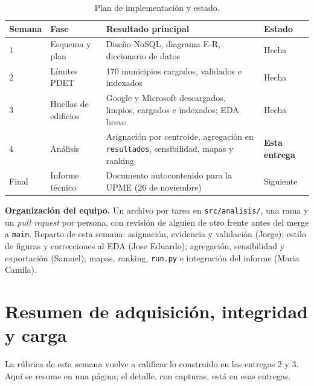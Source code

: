 \documentclass[11pt,a4paper]{article}
\newcommand{\campo}[1]{\texttt{#1}}
\begin{document}
\begin{table}[H]
  \centering\small
  \caption{Plan de implementación y estado.}
  \label{tab:plan}
  \begin{tabularx}{\textwidth}{@{}l L L l@{}}
    \toprule
    Semana & Fase & Resultado principal & Estado \\
     & Esquema y plan & Diseño NoSQL, diagrama E-R, diccionario de datos & Hecha \\
    2 & Límites PDET & 170 municipios cargados, validados e indexados & Hecha \\
    3 & Huellas de edificios & Google y Microsoft descargados, limpios, cargados e
        indexados; EDA breve & Hecha \\
    4 & Análisis & Asignación por centroide, agregación en \campo{resultados},
        sensibilidad, mapas y ranking & \textbf{Esta entrega} \\
    Final & Informe técnico & Documento autocontenido para la UPME (26 de noviembre) & Siguiente \\
    \bottomrule
  \end{tabularx}
\end{table}

\textbf{Organización del equipo.} Un archivo por tarea en
\campo{src/analisis/}, una rama y un \emph{pull request} por persona, con
revisión de alguien de otro frente antes del merge a \campo{main}. Reparto de
esta semana: asignación, evidencia y validación (Jorge); estilo de figuras y
correcciones al EDA (Jose Eduardo); agregación, sensibilidad y exportación
(Samuel); mapas, ranking, \campo{run.py} e integración del informe (Maria
Camila).

\section{Resumen de adquisición, integridad y carga}
\label{sec:resumen-previo}

La rúbrica de esta semana vuelve a calificar lo construido en las entregas 2 y
3. Aquí se resume en una página; el detalle, con capturas, está en esas
entregas.
\end{document}
